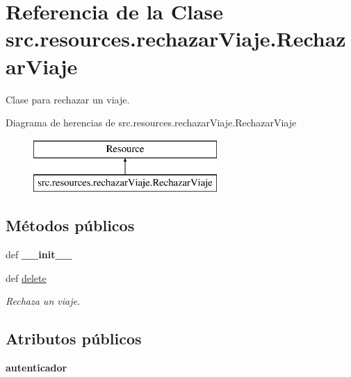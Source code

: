 \hypertarget{classsrc_1_1resources_1_1rechazar_viaje_1_1_rechazar_viaje}{\section{Referencia de la Clase src.\-resources.\-rechazar\-Viaje.\-Rechazar\-Viaje}
\label{classsrc_1_1resources_1_1rechazar_viaje_1_1_rechazar_viaje}
}


Clase para rechazar un viaje.  


Diagrama de herencias de src.\-resources.\-rechazar\-Viaje.\-Rechazar\-Viaje\begin{figure}[H]
\begin{center}
\leavevmode
\includegraphics[height=2.000000cm]{classsrc_1_1resources_1_1rechazar_viaje_1_1_rechazar_viaje}
\end{center}
\end{figure}
\subsection*{Métodos públicos}
\begin{DoxyCompactItemize}
\item 
\hypertarget{classsrc_1_1resources_1_1rechazar_viaje_1_1_rechazar_viaje_a35de1a8addbda44a110905596f5da3d4}{def {\bfseries \-\_\-\-\_\-init\-\_\-\-\_\-}}\label{classsrc_1_1resources_1_1rechazar_viaje_1_1_rechazar_viaje_a35de1a8addbda44a110905596f5da3d4}

\item 
def \hyperlink{classsrc_1_1resources_1_1rechazar_viaje_1_1_rechazar_viaje_a0630eb300ec608dc64b4424551215167}{delete}
\begin{DoxyCompactList}\small\item\em Rechaza un viaje. \end{DoxyCompactList}\end{DoxyCompactItemize}
\subsection*{Atributos públicos}
\begin{DoxyCompactItemize}
\item 
\hypertarget{classsrc_1_1resources_1_1rechazar_viaje_1_1_rechazar_viaje_aff5a6b66ffb0f2181fa6ee9d03a6d3b7}{{\bfseries autenticador}}\label{classsrc_1_1resources_1_1rechazar_viaje_1_1_rechazar_viaje_aff5a6b66ffb0f2181fa6ee9d03a6d3b7}

\end{DoxyCompactItemize}

